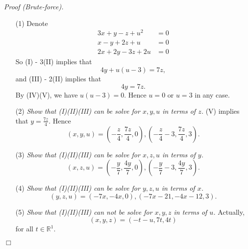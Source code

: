 \documentclass{article}
\begin{document}
\emph{Proof (Brute-force).}
\begin{enumerate}
\item[(1)]
  Denote
  \begin{align*}
    3x+y-z+u^2 &= 0 \tag{I} \\
    x-y+2z+u &= 0 \tag{II} \\
    2x+2y-3z+2u &= 0 \tag{III}
  \end{align*}
  So (I) - 3(II) implies that
  \[
    4y + u(u-3) = 7z \tag{IV},
  \]
  and (III) - 2(II) implies that
  \[
    4y = 7z \tag{V}.
  \]
  By (IV)(V), we have $u(u-3) = 0$.
  Hence $u = 0$ or $u = 3$ in any case.

\item[(2)]
  \emph{Show that (I)(II)(III) can be solve for $x,y,u$ in terms of $z$.}
  (V) implies that $y = \frac{7z}{4}$.
  Hence
  \[
    (x,y,u)
    =
    \left(-\frac{z}{4}, \frac{7z}{4}, 0 \right),
    \left(-\frac{z}{4}-3, \frac{7z}{4}, 3 \right).
  \]

\item[(3)]
  \emph{Show that (I)(II)(III) can be solve for $x,z,u$ in terms of $y$.}
  \[
    (x,z,u)
    =
    \left(-\frac{y}{7}, \frac{4y}{7}, 0 \right),
    \left(-\frac{y}{7}-3, \frac{4y}{7}, 3 \right).
  \]

\item[(4)]
  \emph{Show that (I)(II)(III) can be solve for $y,z,u$ in terms of $x$.}
  \[
    (y,z,u)
    =
    \left(-7x, -4x, 0 \right),
    \left(-7x-21, -4x-12, 3 \right).
  \]

\item[(5)]
  \emph{Show that (I)(II)(III) can not be solve for $x,y,z$ in terms of $u$.}
  Actually,
  \[
    (x,y,z)
    = \left(-t-u, 7t, 4t \right)
  \]
  for all $t \in \mathbb{R}^1$.
\end{enumerate}
$\Box$ \\
\end{document}
